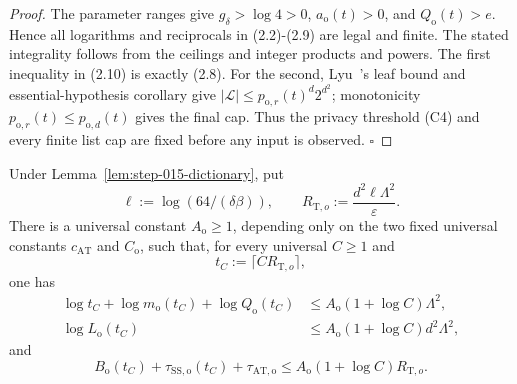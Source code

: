 \begin{proof}
The parameter ranges give \(g_\delta>\log4>0\),
\(a_{\mathrm o}(t)>0\), and \(Q_{\mathrm o}(t)>e\). Hence all logarithms
and reciprocals in (2.2)-(2.9) are legal and finite. The stated
integrality follows from the ceilings and integer products and powers.
The first inequality in (2.10) is exactly (2.8). For the second, Lyu~\citep{lyu2025}'s
leaf bound and essential-hypothesis corollary give
\(|\mathcal L|\le p_{\mathrm o,r}(t)^d2^{d^2}\); monotonicity
\(p_{\mathrm o,r}(t)\le p_{\mathrm o,d}(t)\) gives the final cap.
Thus the privacy threshold (C4) and every finite list cap are fixed
before any input is observed. \(\square\)


\end{proof}

\begin{lemma}\label{lem:step-015-envelope}
Under Lemma~\ref{lem:step-015-dictionary}, put
\[
\ell:=\log(64/(\delta\beta)),\qquad
R_{\mathrm T,o}:=\frac{d^2\ell\Lambda^2}{\varepsilon}.
\tag{3.1}
\]
There is a universal constant \(A_{\mathrm o}\ge1\), depending only on
the two fixed universal constants \(c_{\mathrm{AT}}\) and \(C_{\mathrm o}\),
such that, for every universal \(C\ge1\) and
\[
t_C:=\lceil C R_{\mathrm T,o}\rceil,
\tag{3.2}
\]
one has
\[
\begin{aligned}
\log t_C+\log m_{\mathrm o}(t_C)+\log Q_{\mathrm o}(t_C)
&\le A_{\mathrm o}(1+\log C)\Lambda^2,\\
\log L_{\mathrm o}(t_C)
&\le A_{\mathrm o}(1+\log C)d^2\Lambda^2,
\end{aligned}
\tag{3.3}
\]
and
\[
B_{\mathrm o}(t_C)+\tau_{\mathrm{SS,o}}(t_C)
+\tau_{\mathrm{AT,o}}
\le A_{\mathrm o}(1+\log C)R_{\mathrm T,o}.
\tag{3.4}
\]


\end{lemma}

